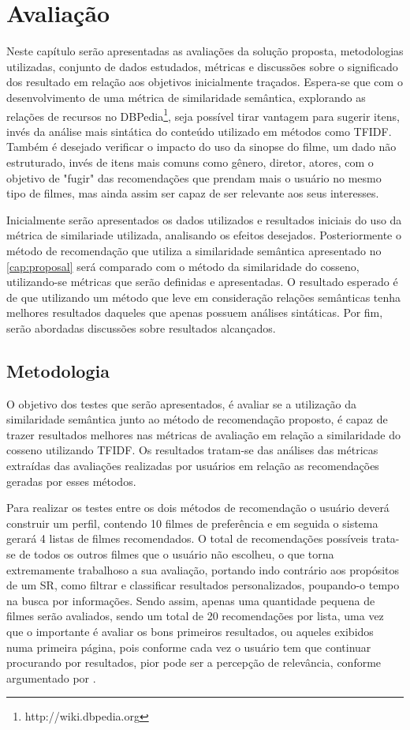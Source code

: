 \chapter{Avaliação}
\label{cap:evaluation}

Neste capítulo serão apresentadas as avaliações da solução proposta, metodologias utilizadas,  conjunto de dados estudados, métricas e discussões sobre o significado dos resultado em relação aos objetivos inicialmente traçados. Espera-se que com o desenvolvimento de uma métrica de similaridade semântica, explorando as relações de recursos no DBPedia\footnote{http://wiki.dbpedia.org}, seja possível tirar vantagem para sugerir itens, invés da análise mais sintática do conteúdo utilizado em métodos como \ac{TFIDF}. Também é desejado verificar o impacto do uso da sinopse do filme, um dado não estruturado, invés de itens mais comuns como gênero, diretor, atores, com o objetivo de "fugir" das recomendações que prendam mais o usuário no mesmo tipo de filmes, mas ainda assim ser capaz de ser relevante aos seus interesses.

Inicialmente serão apresentados os dados utilizados e resultados iniciais do uso da métrica de similariade utilizada, analisando os efeitos desejados. Posteriormente o método de recomendação que utiliza a similaridade semântica apresentado no \ref{cap:proposal} será comparado com o método da similaridade do cosseno, utilizando-se métricas que serão definidas e apresentadas. O resultado esperado é de que utilizando um método que leve em consideração relações semânticas tenha melhores resultados daqueles que apenas possuem análises sintáticas. Por fim, serão abordadas discussões sobre resultados alcançados.

\section{Metodologia}

O objetivo dos testes que serão apresentados, é avaliar se a utilização da similaridade semântica junto ao método de recomendação proposto, é capaz de trazer resultados melhores nas métricas de avaliação em relação a similaridade do cosseno utilizando \ac{TFIDF}.  Os resultados tratam-se das análises das métricas extraídas das avaliações realizadas por usuários em relação as recomendações geradas por esses métodos.

Para realizar os testes entre os dois métodos de recomendação o usuário deverá construir um perfil, contendo 10 filmes de preferência e em seguida o sistema gerará 4 listas de filmes recomendados. O total de recomendações possíveis trata-se de todos os outros filmes que o usuário não escolheu, o que torna extremamente trabalhoso a sua avaliação, portando indo contrário aos propósitos de um \ac{SR}, como filtrar e classificar resultados personalizados, poupando-o tempo na busca por informações. Sendo assim, apenas uma quantidade pequena de filmes serão avaliados, sendo um total de 20 recomendações por lista, uma vez que o importante é avaliar os bons primeiros resultados, ou aqueles exibidos numa primeira página, pois conforme cada vez o usuário tem que continuar procurando por resultados, pior pode ser a percepção de relevância, conforme argumentado por \cite{Manning:2008}. 

